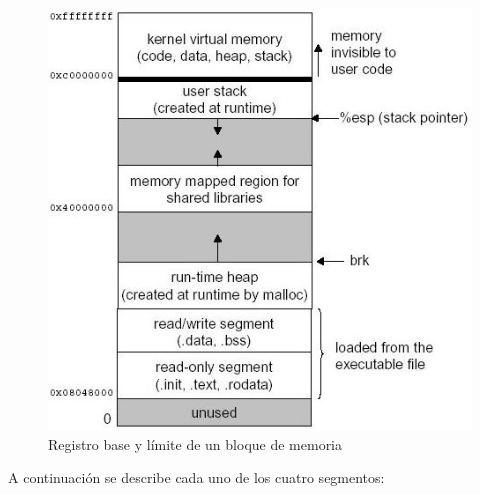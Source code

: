 \begin{figure}[htbp]
\centering
\includegraphics[scale=2]{img/C07_memoria/memoria.png}
\caption{Registro base y límite de un bloque de memoria}
\label{fig:memoria}
\end{figure}

A continuación se describe cada uno de los cuatro segmentos:

